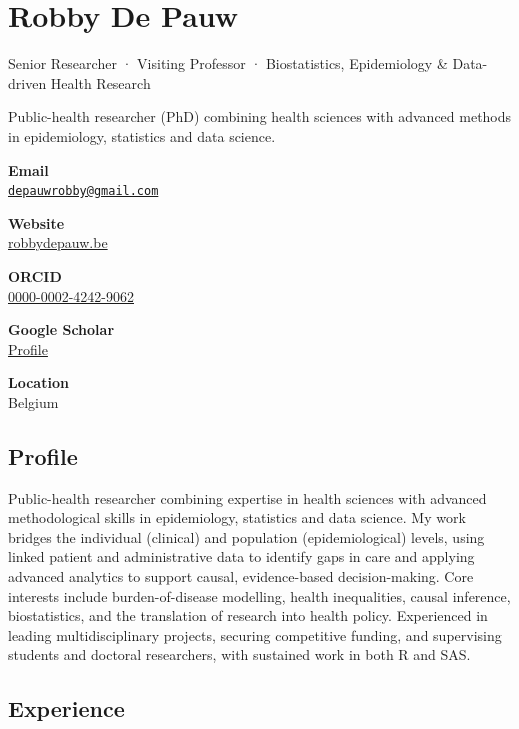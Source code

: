 \documentclass[
  letterpaper,
  DIV=11,
  numbers=noendperiod]{scrartcl}
\author{}
\date{}
\begin{document}
\section{Robby De Pauw}\label{robby-de-pauw}

{Senior Researcher · Visiting Professor · Biostatistics, Epidemiology \&
Data-driven Health Research}

Public-health researcher (PhD) combining health sciences with advanced
methods in epidemiology, statistics and data science.

\textbf{Email}\\
\href{mailto:depauwrobby@gmail.com}{\nolinkurl{depauwrobby@gmail.com}}

\textbf{Website}\\
\href{https://www.robbydepauw.be/}{robbydepauw.be}

\textbf{ORCID}\\
\href{https://orcid.org/0000-0002-4242-9062}{0000-0002-4242-9062}

\textbf{Google Scholar}\\
\href{https://scholar.google.com/citations?user=ZDPPxVkAAAAJ&hl=nl}{Profile}

\textbf{Location}\\
Belgium

\subsection{Profile}\label{profile}

Public-health researcher combining expertise in health sciences with
advanced methodological skills in epidemiology, statistics and data
science. My work bridges the individual (clinical) and population
(epidemiological) levels, using linked patient and administrative data
to identify gaps in care and applying advanced analytics to support
causal, evidence-based decision-making. Core interests include
burden-of-disease modelling, health inequalities, causal inference,
biostatistics, and the translation of research into health policy.
Experienced in leading multidisciplinary projects, securing competitive
funding, and supervising students and doctoral researchers, with
sustained work in both R and SAS.

\subsection{Experience}\label{experience}
\end{document}
